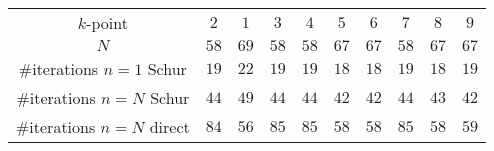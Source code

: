 \begin{tabular}{cccccccccc}
$k$-point & $2$ & $1$ & $3$ & $4$ & $5$ & $6$ & $7$ & $8$ & $9$\\
$N$ & $58$ & $69$ & $58$ & $58$ & $67$ & $67$ & $58$ & $67$ & $67$\\
\#iterations $n=1$ Schur & $19$ & $22$ & $19$ & $19$ & $18$ & $18$ & $19$ & $18$ & $19$\\
\#iterations $n=N$ Schur & $44$ & $49$ & $44$ & $44$ & $42$ & $42$ & $44$ & $43$ & $42$\\
\#iterations $n=N$ direct & $84$ & $56$ & $85$ & $85$ & $58$ & $58$ & $85$ & $58$ & $59$\\
\end{tabular}
